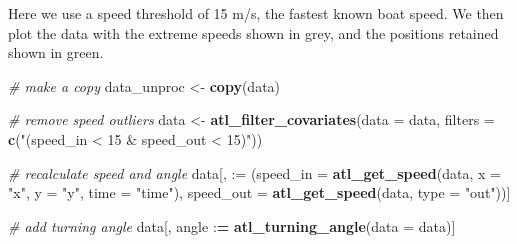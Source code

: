 \documentclass[
]{scrartcl}
\newenvironment{Shaded}{}{}
\newcommand{\CommentTok}[1]{\textcolor[rgb]{0.38,0.63,0.69}{\textit{#1}}}
\newcommand{\DataTypeTok}[1]{\textcolor[rgb]{0.56,0.13,0.00}{#1}}
\newcommand{\ErrorTok}[1]{\textcolor[rgb]{1.00,0.00,0.00}{\textbf{#1}}}
\newcommand{\KeywordTok}[1]{\textcolor[rgb]{0.00,0.44,0.13}{\textbf{#1}}}
\newcommand{\NormalTok}[1]{#1}
\newcommand{\OperatorTok}[1]{\textcolor[rgb]{0.40,0.40,0.40}{#1}}
\newcommand{\StringTok}[1]{\textcolor[rgb]{0.25,0.44,0.63}{#1}}
\begin{document}
Here we use a speed threshold of 15 m/s, the fastest known boat speed.
We then plot the data with the extreme speeds shown in grey, and the positions retained shown in green.

\begin{Shaded}
\begin{Highlighting}[]
\CommentTok{\# make a copy}
\NormalTok{data\_unproc <{-}}\StringTok{ }\KeywordTok{copy}\NormalTok{(data)}

\CommentTok{\# remove speed outliers}
\NormalTok{data <{-}}\StringTok{ }\KeywordTok{atl\_filter\_covariates}\NormalTok{(}\DataTypeTok{data =}\NormalTok{ data,}
            \DataTypeTok{filters =} \KeywordTok{c}\NormalTok{(}\StringTok{"(speed\_in < 15 \& speed\_out < 15)"}\NormalTok{))}

\CommentTok{\# recalculate speed and angle}
\NormalTok{data[, }\StringTok{\textasciigrave{}}\DataTypeTok{:=}\StringTok{\textasciigrave{}}\NormalTok{ (}\DataTypeTok{speed\_in =} \KeywordTok{atl\_get\_speed}\NormalTok{(data, }
                                      \DataTypeTok{x =} \StringTok{"x"}\NormalTok{, }
                                      \DataTypeTok{y =} \StringTok{"y"}\NormalTok{, }
                                      \DataTypeTok{time =} \StringTok{"time"}\NormalTok{),}
             \DataTypeTok{speed\_out =} \KeywordTok{atl\_get\_speed}\NormalTok{(data, }\DataTypeTok{type =} \StringTok{"out"}\NormalTok{))]}

\CommentTok{\# add turning angle}
\NormalTok{data[, angle }\OperatorTok{:}\ErrorTok{=}\StringTok{ }\KeywordTok{atl\_turning\_angle}\NormalTok{(}\DataTypeTok{data =}\NormalTok{ data)]}
\end{Highlighting}
\end{Shaded}
\end{document}
